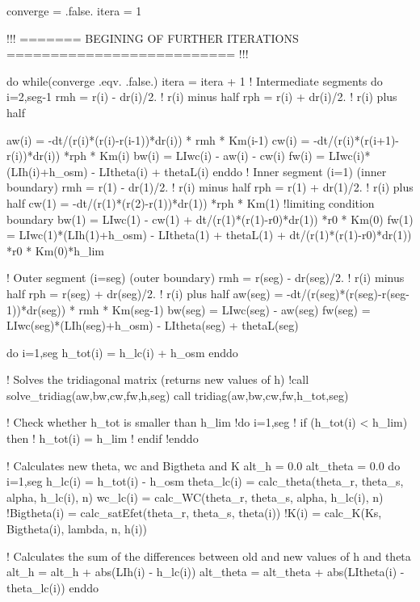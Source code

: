     converge = .false.
    itera = 1
    
    !!! ======= BEGINING OF FURTHER ITERATIONS ========================== !!!
    
    do while(converge .eqv. .false.)
      itera = itera + 1
      ! Intermediate segments
      do i=2,seg-1
        rmh = r(i) - dr(i)/2.	! r(i) minus half
        rph = r(i) + dr(i)/2.	! r(i) plus half
      
        aw(i) = -dt/(r(i)*(r(i)-r(i-1))*dr(i)) * rmh * Km(i-1)
        cw(i) = -dt/(r(i)*(r(i+1)-r(i))*dr(i)) *rph * Km(i)
        bw(i) = LIwc(i) - aw(i) - cw(i)
        fw(i) = LIwc(i)*(LIh(i)+h_osm) - LItheta(i) + thetaL(i)
      enddo
      ! Inner segment (i=1) (inner boundary)
      rmh = r(1) - dr(1)/2.	! r(i) minus half
      rph = r(1) + dr(1)/2.	! r(i) plus half
      cw(1) = -dt/(r(1)*(r(2)-r(1))*dr(1)) *rph * Km(1)
      !limiting condition boundary
      bw(1) = LIwc(1) - cw(1) + dt/(r(1)*(r(1)-r0)*dr(1)) *r0 * Km(0)
      fw(1) = LIwc(1)*(LIh(1)+h_osm) - LItheta(1) + thetaL(1) + dt/(r(1)*(r(1)-r0)*dr(1)) *r0 * Km(0)*h_lim
      
      ! Outer segment (i=seg) (outer boundary)
      rmh = r(seg) - dr(seg)/2.	! r(i) minus half
      rph = r(seg) + dr(seg)/2.	! r(i) plus half
      aw(seg) = -dt/(r(seg)*(r(seg)-r(seg-1))*dr(seg)) * rmh * Km(seg-1)
      bw(seg) = LIwc(seg) - aw(seg)
      fw(seg) = LIwc(seg)*(LIh(seg)+h_osm) - LItheta(seg) + thetaL(seg)

      do i=1,seg
        h_tot(i) = h_lc(i) + h_osm
      enddo

    
      ! Solves the tridiagonal matrix (returns new values of h)
      !call solve_tridiag(aw,bw,cw,fw,h,seg)
      call tridiag(aw,bw,cw,fw,h_tot,seg)
    
      ! Check whether h_tot is smaller than h_lim
      !do i=1,seg
      !  if (h_tot(i) < h_lim) then
      !    h_tot(i) = h_lim
      !  endif
      !enddo

      ! Calculates new theta, wc and Bigtheta and K
      alt_h = 0.0
      alt_theta = 0.0
      do i=1,seg
        h_lc(i) = h_tot(i) - h_osm
        theta_lc(i) = calc_theta(theta_r, theta_s, alpha, h_lc(i), n)
        wc_lc(i) = calc_WC(theta_r, theta_s, alpha, h_lc(i), n)
        !Bigtheta(i) = calc_satEfet(theta_r, theta_s, theta(i))
        !K(i) = calc_K(Ks, Bigtheta(i), lambda, n, h(i))
      
        ! Calculates the sum of the differences between old and new values of h and theta
        alt_h = alt_h + abs(LIh(i) - h_lc(i))
        alt_theta = alt_theta + abs(LItheta(i) - theta_lc(i))
      enddo
 
